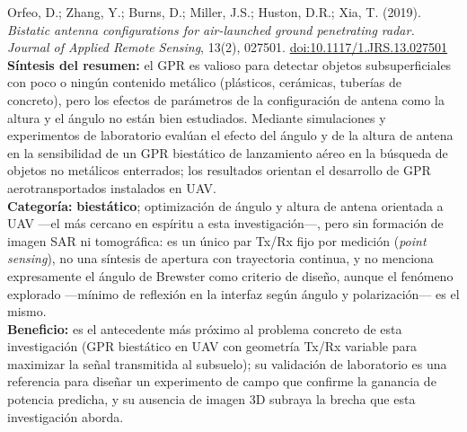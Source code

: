 \documentclass[11pt,a4paper]{report}
\begin{document}
\begin{enumerate}[label=\textbf{[E\arabic*]}, leftmargin=2.2cm, itemsep=10pt]
\item Orfeo, D.; Zhang, Y.; Burns, D.; Miller, J.S.; Huston, D.R.; Xia, T.
(2019). \textit{Bistatic antenna configurations for air-launched ground
penetrating radar.} \emph{Journal of Applied Remote Sensing}, 13(2),
027501. \href{https://doi.org/10.1117/1.JRS.13.027501}{doi:10.1117/1.JRS.13.027501}
\cite{orfeo2019}\\
\textbf{Síntesis del resumen:} el GPR es valioso para detectar objetos
subsuperficiales con poco o ningún contenido metálico (plásticos,
cerámicas, tuberías de concreto), pero los efectos de parámetros de la
configuración de antena como la altura y el ángulo no están bien estudiados.
Mediante simulaciones y experimentos de laboratorio evalúan el efecto del
ángulo y de la altura de antena en la sensibilidad de un GPR biestático de
lanzamiento aéreo en la búsqueda de objetos no metálicos enterrados; los
resultados orientan el desarrollo de GPR aerotransportados instalados en
UAV.\\
\textbf{Categoría:} \textbf{biestático}; optimización de ángulo y altura de
antena orientada a UAV ---el más cercano en espíritu a esta
investigación---, pero sin formación de imagen SAR ni tomográfica: es un
único par Tx/Rx fijo por medición (\emph{point sensing}), no una síntesis de
apertura con trayectoria continua, y no menciona expresamente el ángulo de
Brewster como criterio de diseño, aunque el fenómeno explorado ---mínimo de
reflexión en la interfaz según ángulo y polarización--- es el mismo.\\
\textbf{Beneficio:} es el antecedente más próximo al problema concreto de
esta investigación (GPR biestático en UAV con geometría Tx/Rx variable para
maximizar la señal transmitida al subsuelo); su validación de laboratorio es
una referencia para diseñar un experimento de campo que confirme la
ganancia de potencia predicha, y su ausencia de imagen 3D subraya la brecha
que esta investigación aborda.

\end{enumerate}
\end{document}
